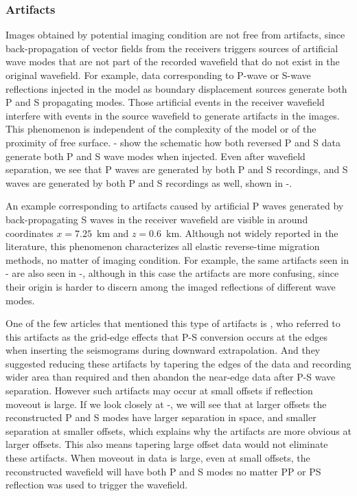 

\subsubsection{Artifacts}
Images obtained by potential imaging condition are not free from artifacts, since back-propagation of vector fields from the receivers triggers sources of artificial wave modes that are not part of the recorded wavefield that do not exist in the original  wavefield. 
For example, data corresponding to P-wave or S-wave reflections injected in the model as boundary displacement sources generate both P and S propagating modes. Those artificial events in the receiver wavefield interfere with events in the source wavefield  to generate artifacts in the images. This phenomenon is independent of the complexity of the model or of the proximity of free surface. - show the schematic how both reversed P and S data generate both P and S wave modes when injected. Even after wavefield separation, we see that P waves are generated by both P and S recordings, and S waves are generated by both P and S recordings as well, shown in -.

An example corresponding to artifacts caused by artificial P waves generated by back-propagating S waves in the receiver wavefield are visible in  around coordinates $x=7.25$~km and $z=0.6$~km. Although not widely reported in the literature, this phenomenon characterizes all elastic reverse-time migration methods, no matter of imaging condition. For example, the same artifacts seen in - are also seen in  -, although in this case the artifacts are more confusing, since their origin is harder to discern among the imaged reflections of different wave modes.

One of the few articles that mentioned this type of artifacts is \cite{sun:286}, who referred to this artifacts as the grid-edge effects that P-S conversion occurs at the edges when inserting the seismograms during downward extrapolation. And they suggested reducing these artifacts by tapering the edges of the data and recording wider area than required and then abandon the near-edge data after P-S wave separation. However such artifacts may occur at small offsets if reflection moveout is large. If we look closely at -, we will see that at larger offsets the reconstructed P and S modes have larger separation in space, and smaller separation at smaller offsets, which explains why the artifacts are more obvious at larger offsets. This also means tapering large offset data would not eliminate these artifacts. When moveout in data is large, even at small offsets, the reconstructed wavefield will have both P and S modes no matter PP or PS reflection was used to trigger the wavefield.

